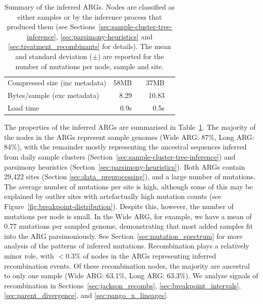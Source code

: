 \documentclass{article}
\begin{document}
\begin{table}
\begin{center}
\begin{tabular}{llrlrl}
    \cmidrule{2-6}
    \multicolumn{2}{l}{Compressed size (inc metadata)} & 58MB & & 37MB&  \\
    \multicolumn{2}{l}{Bytes/sample (exc metadata)}  & 8.29  & & 10.83 \\
    Load time & & 0.9s & & 0.5s & \\
    \bottomrule
\end{tabular}
\end{center}
\caption{\label{tab:args}Summary of the inferred ARGs. Nodes are classified
as either samples or by the inference process that produced them
(see Sections~\ref{sec:sample-cluster-tree-inference},
\ref{sec:parsimony-heuristics} and \ref{sec:treatment_recombinants} for
details).
The mean and standard deviation ($\pm$)
are reported for the number of mutations per node, sample and site.
}
\end{table}

The properties of the inferred ARGs are summarised in Table~\ref{tab:args}.
The majority of the nodes in the ARGs represent sample genomes
(Wide ARG: 87\%, Long ARG: 84\%), with the remainder mostly representing
the ancestral sequences inferred
from daily sample clusters (Section~\ref{sec:sample-cluster-tree-inference})
and parsimony heuristics (Section~\ref{sec:parsimony-heuristics}).
Both ARGs contain 29,422 sites (Section \ref{sec:data_preprocessing}),
and a large number of mutations.
The average number of mutations per site is high, although some
of this may be explained by outlier sites with artefactually high
mutation counts (see Figure~\ref{fig:breakpoint-distribution}).
Despite this, however, the number of mutations per node
is small. In the Wide ARG, for example, we have a mean of 0.77
mutations per sampled genome, demonstrating that most
added samples fit into the ARG parsimoniously.
See Section~\ref{sec:mutation_spectrum}
for more analysis of the patterns of inferred mutations.
Recombination plays a relatively minor role, with $<0.3\%$
of nodes in the ARGs representing inferred recombination events.
Of these recombination nodes, the majority are ancestral
to only one sample (Wide ARG: 63.1\%, Long ARG: 63.3\%).
We analyse signals of recombination in Sections~\ref{sec:jackson_recombs},
\ref{sec:breakpoint_intervals}, \ref{sec:parent_divergence},
and \ref{sec:pango_x_lineages}.
\end{document}
